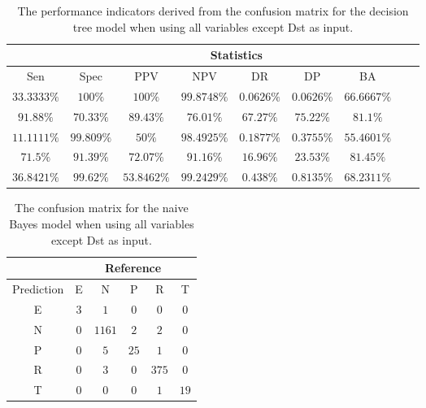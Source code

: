 \begin{table}[!ht]
	\centering
	\begin{tabular}{|c|c|c|c|c|c|c|c|c|}
		\hline
		 & \multicolumn{7}{c|}{Statistics} \\ \hline
		Sen & Spec & PPV & NPV & DR & DP & BA \\ \hline
		$33.3333\%$ & $100\%$ & $100\%$ & $99.8748\%$ & $0.0626\%$ & $0.0626\%$ & $66.6667\%$ \\ \hline
		$91.88\%$ & $70.33\%$ & $89.43\%$ & $76.01\%$ & $67.27\%$ & $75.22\%$ & $81.1\%$ \\ \hline
		$11.1111\%$ & $99.809\%$ & $50\%$ & $98.4925\%$ & $0.1877\%$ & $0.3755\%$ & $55.4601\%$ \\ \hline
		$71.5\%$ & $91.39\%$ & $72.07\%$ & $91.16\%$ & $16.96\%$ & $23.53\%$ & $81.45\%$ \\ \hline
		$36.8421\%$ & $99.62\%$ & $53.8462\%$ & $99.2429\%$ & $0.438\%$ & $0.8135\%$ & $68.2311\%$ \\ \hline
	\end{tabular}
	\caption{The performance indicators derived from the confusion matrix for the decision tree model when using all variables except Dst as input.}
	\label{tab:cs:noDst:C5.0}
\end{table}

\begin{table}[!ht]
	\centering
	\begin{tabular}{|c|c|c|c|c|c|}
		\hline
		 & \multicolumn{5}{|c|}{Reference} \\ \hline
		 Prediction & E & N & P & R & T \\ \hline
		 E & $3$ & $1$ & $0$ & $0$ & $0$ \\ \hline
		 N & $0$ & $1161$ & $2$ & $2$ & $0$ \\ \hline
		 P & $0$ & $5$ & $25$ & $1$ & $0$ \\ \hline
		 R & $0$ & $3$ & $0$ & $375$ & $0$ \\ \hline
		 T & $0$ & $0$ & $0$ & $1$ & $19$ \\ \hline
	\end{tabular}
	\caption{The confusion matrix for the naive Bayes model when using all variables except Dst as input.}
	\label{tab:cm:noDst:nb}
\end{table}

